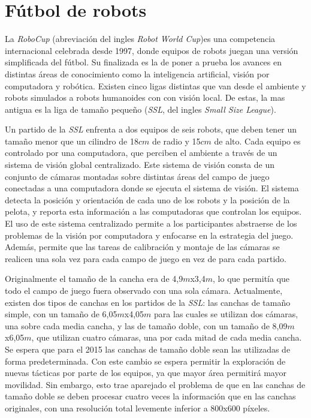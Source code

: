 
\section{Fútbol de robots}

La \emph{RoboCup} (abreviación del ingles \emph{Robot World Cup})es una
competencia internacional celebrada desde 1997, donde equipos de robots juegan
una versión simplificada del fútbol. Su finalizada es la de poner a prueba los
avances en distintas áreas de conocimiento como la inteligencia artificial,
visión por computadora y robótica. Existen cinco ligas distintas que van desde
el ambiente y robots simulados a robots humanoides con con visión local. De
estas, la mas antigua es la liga de tamaño pequeño (\emph{SSL}, del ingles
\emph{Small Size League}).

Un partido de la \emph{SSL} enfrenta a dos equipos de seis robots, que deben
tener un tamaño menor que un cilindro de 18$cm$ de radio y 15$cm$ de
alto\cite{sslrules2014}. Cada equipo es controlado por una computadora, que
perciben el ambiente a través de un sistema de visión global centralizado. Este
sistema de visión consta de un conjunto de cámaras montadas sobre distintas
áreas del campo de juego conectadas a una computadora donde se ejecuta el
sistema de visión. El sistema detecta la posición y orientación de cada uno de
los robots y la posición de la pelota, y reporta esta información a las
computadoras que controlan los equipos. El uso de este sistema centralizado
permite a los participantes abstraerse de los problemas de la visión por
computadora y enfocarse en la estrategia del juego. Además, permite que las
tareas de calibración y montaje de las cámaras se realicen una sola vez para
cada campo de juego en vez de para cada partido.

Originalmente el tamaño de la cancha era de 4,9$m$x3,4$m$, lo que permitía que
todo el campo de juego fuera observado con una sola cámara. Actualmente, existen
dos tipos de canchas en los partidos de la \emph{SSL}: las canchas de tamaño
simple, con un tamaño de 6,05$m$x4,05$m$ para las cuales se utilizan dos
cámaras, una sobre cada media cancha, y las de tamaño doble, con un tamaño de
8,09$m$x6,05$m$, que utilizan cuatro cámaras, una por cada mitad de cada media
cancha. Se espera que para el 2015 las canchas de tamaño doble sean las
utilizadas de forma predeterminada. Con este cambio se espera permitir la
exploración de nuevas tácticas por parte de los equipos, ya que mayor área
permitirá mayor movilidad. Sin embargo, esto trae aparejado el problema de que
en las canchas de tamaño doble se deben procesar cuatro veces la información que
en las canchas originales, con una resolución total levemente inferior a 800x600
píxeles.
